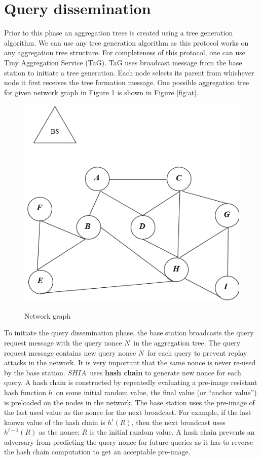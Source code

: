 	\section{Query dissemination}
		Prior to this phase an aggregation trees is created using a tree generation algorithm.
		We can use any tree generation algorithm as this protocol works on any aggregation tree structure.
		For completeness of this protocol, one can use Tiny Aggregation Service (TaG)\cite{madden2002tag}.
		TaG uses broadcast message from the base station to initiate a tree generation.
		Each node selects its parent from whichever node it first receives the tree formation message.
		One possible aggregation tree for given network graph in Figure \ref{fig:ng} is shown in Figure \ref{fig:at}. 
		\begin{figure}[hp]
			\centering
			\includegraphics[scale = 1]{images/network-graph.png}\\
			\caption{Network graph}
			\label{fig:ng}
		\end{figure}
		
		To initiate the query dissemination phase, the base station broadcasts the query request message with the query nonce $N$\ in the aggregation tree. 
		The query request message contains new query nonce $N$\ for each query to prevent replay attacks in the network.
		It is very important that the same nonce is never re-used by the base station.
		$SHIA$\ uses \textbf{hash chain} to generate new nonce for each query. 
		A hash chain is constructed by repeatedly evaluating a pre-image resistant hash function $h$\ on some initial random value, the final value (or ``anchor value'') is preloaded on the nodes in the network.
		The base station uses the pre-image of the last used  value as the nonce for the next broadcast.
		For example, if the last known value of the hash chain is $h^i(R)$, then the next broadcast uses $h^{i-1}(R)$ as the nonce; $R$ is the initial random value.  
		A hash chain prevents an adversary from predicting the query nonce for future queries as it has to reverse the hash chain computation to get an acceptable pre-image.

